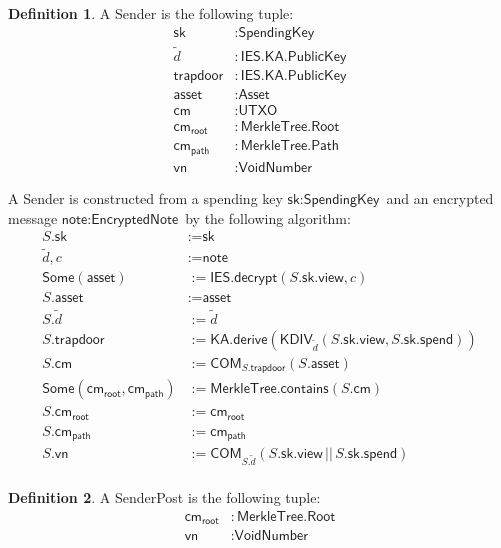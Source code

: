 \documentclass[a4paper]{article}
\theoremstyle{definition}
\newtheorem{definition}{Definition}[subsection]
\newcommand{\Asset}{{\textsf{Asset}}}
\newcommand{\COM}{{\textsf{COM}}}
\newcommand{\EncryptedNote}{{\textsf{EncryptedNote}}}
\newcommand{\IES}{{\textsf{IES}}}
\newcommand{\KA}{{\textsf{KA}}}
\newcommand{\KDIV}{{\textsf{KDIV}}}
\newcommand{\MerkleTree}{{\textsf{MerkleTree}}}
\newcommand{\PATH}{{\textsf{path}}}
\newcommand{\Path}{{\textsf{Path}}}
\newcommand{\PublicKey}{{\textsf{PublicKey}}}
\newcommand{\ROOT}{{\textsf{root}}}
\newcommand{\Root}{{\textsf{Root}}}
\newcommand{\SenderPost}{{\textsf{SenderPost}}}
\newcommand{\Sender}{{\textsf{Sender}}}
\newcommand{\Some}{{\textsf{Some}}}
\newcommand{\SpendingKey}{{\textsf{SpendingKey}}}
\newcommand{\UTXO}{{\textsf{UTXO}}}
\newcommand{\VoidNumber}{{\textsf{VoidNumber}}}
\newcommand{\asset}{{\textsf{asset}}}
\newcommand{\cm}{{\textsf{cm}}}
\newcommand{\contains}{{\textsf{contains}}}
\newcommand{\decrypt}{{\textsf{decrypt}}}
\newcommand{\derive}{{\textsf{derive}}}
\newcommand{\note}{{\textsf{note}}}
\newcommand{\sk}{{\textsf{sk}}}
\newcommand{\spend}{{\textsf{spend}}}
\newcommand{\trapdoor}{{\textsf{trapdoor}}}
\newcommand{\view}{{\textsf{view}}}
\newcommand{\vn}{{\textsf{vn}}}
\begin{document}
\begin{definition}
    A \Sender{} is the following tuple:
    \begin{align*}
        \sk       &: \SpendingKey \\
        \tilde{d} &: \IES.\KA.\PublicKey \\
        \trapdoor &: \IES.\KA.\PublicKey \\
        \asset    &: \Asset \\
        \cm       &: \UTXO \\
        \cm_\ROOT &: \MerkleTree.\Root \\
        \cm_\PATH &: \MerkleTree.\Path \\
        \vn       &: \VoidNumber
    \end{align*}

    A \Sender{} is constructed from a spending key $\sk : \SpendingKey$ and an encrypted message $\note : \EncryptedNote$ by the following algorithm:
    \begin{align*}
        S.\sk                       &:= \sk \\
        \tilde{d}, c                &:= \note \\
        \Some(\asset)               &:= \IES.\decrypt(S.\sk.\view, c) \\
        S.\asset                    &:= \asset \\
        S.\tilde{d}                 &:= \tilde{d} \\
        S.\trapdoor                 &:= \KA.\derive(\KDIV_{\tilde{d}}(S.\sk.\view, S.\sk.\spend)) \\
        S.\cm                       &:= \COM_{S.\trapdoor}(S.\asset) \\
        \Some(\cm_\ROOT, \cm_\PATH) &:= \MerkleTree.\contains(S.\cm) \\
        S.\cm_\ROOT                 &:= \cm_\ROOT \\
        S.\cm_\PATH                 &:= \cm_\PATH \\
        S.\vn                       &:= \COM_{S.\tilde{d}}(S.\sk.\view \,||\, S.\sk.\spend) \\
    \end{align*}
\end{definition}

\begin{definition}
    A \SenderPost{} is the following tuple:
    \begin{align*}
        \cm_\ROOT &: \MerkleTree.\Root \\
        \vn       &: \VoidNumber
    \end{align*}
\end{definition}
\end{document}
